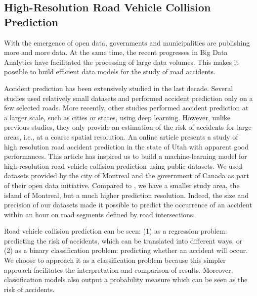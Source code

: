 \documentclass[conference]{IEEEtran}
\begin{document}

\subsection{High-Resolution Road Vehicle Collision Prediction}

With the emergence of open data, governments and municipalities are publishing more and more data. At the same time, the recent progresses in Big Data Analytics have facilitated the processing of large data volumes. This makes it possible to build efficient data models for the study of road accidents.

Accident prediction has been extensively studied in the last decade. Several studies used relatively small datasets and performed accident prediction only on a few selected roads\cite{Chang2005, Chang2005b, Lin2015, Theofilatos2017}. More recently, other studies performed accident prediction at a larger scale, such as cities or states, using deep 
learning\cite{QChen2016, Najjar2017, Yuan2018}.
However, unlike previous studies, they only provide an estimation of the risk of accidents for large areas, i.e., at a coarse spatial resolution. An online article\cite{mediumarticle} presents a study of high resolution road accident prediction in the state of Utah with apparent good performances. This article has inspired us to build a machine-learning model for high-resolution road vehicle collision prediction using public datasets. We used datasets provided by the city of Montreal and the government of Canada as part of their open data initiative. Compared to \cite{mediumarticle}, we have a smaller study area, the island of Montreal, but a much higher prediction resolution. Indeed, the size and precision of our datasets made it possible to predict the occurrence of an accident within an hour on road segments defined by road intersections.

Road vehicle collision prediction can be seen: (1) as a regression problem: predicting the risk of accidents, which can be translated into different ways, or (2) as a binary classification problem: predicting whether an accident will occur. 
We choose to approach it as a classification problem because this simpler approach facilitates the interpretation and comparison of results.
Moreover, classification models also output a probability measure which can be seen as the risk of accidents.

\end{document}
